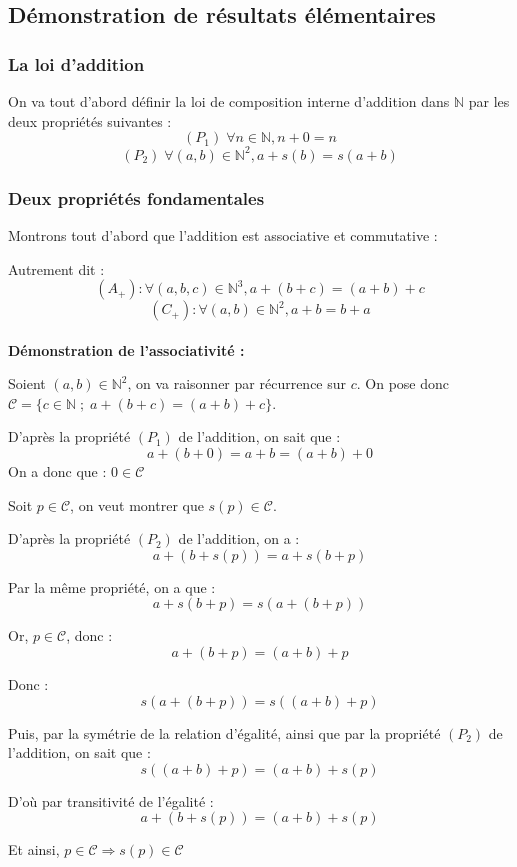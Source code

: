 \documentclass{article}
\begin{document}
\subsection{Démonstration de résultats élémentaires}

\subsubsection{La loi d'addition}
On va tout d'abord définir la loi de composition interne d'addition dans $\mathbb{N}$ par les deux propriétés suivantes :
$$(P_1) \; \forall n \in \mathbb{N}, n + 0 = n$$
$$(P_2) \; \forall (a,b) \in \mathbb{N}^2, a + s(b) = s(a+b)$$
\subsubsection{Deux propriétés fondamentales}


Montrons tout d'abord que l'addition est associative et commutative :

Autrement dit :
$$(A_+) : \forall (a,b,c) \in \mathbb{N}^3, a+(b+c) = (a+b)+c $$
$$(C_+) : \forall (a,b) \in \mathbb{N}^2, a+b=b+a$$
\\

\textbf{Démonstration de l'associativité :}

Soient $(a,b) \in \mathbb{N}^2$, on va raisonner par récurrence sur $c$. On pose donc $\mathcal{C} = \{ c \in \mathbb{N} \; ; \; a+(b+c) = (a+b)+c \}$.

D'après la propriété $(P_1)$ de l'addition, on sait que : 
$$ a + (b + 0) = a + b = (a + b) + 0$$
On a donc que : $0 \in \mathcal{C}$

Soit $p \in \mathcal{C}$, on veut montrer que $s(p) \in \mathcal{C}$.

D'après la propriété $(P_2)$ de l'addition, on a :
$$ a + (b+s(p)) = a + s(b+p)$$

Par la même propriété, on a que :
$$ a + s(b+p) = s(a + (b+p)) $$

Or, $p \in \mathcal{C}$, donc :
$$ a + (b+p) = (a + b) + p $$

Donc :
$$ s(a+(b+p)) = s((a+b)+p) $$

Puis, par la symétrie de la relation d'égalité, ainsi que par la propriété $(P_2)$ de l'addition, on sait que :
$$s((a+b)+p) = (a+b) + s(p)$$

D'où par transitivité de l'égalité :
$$ a + (b + s(p)) = (a+b) + s(p) $$

Et ainsi, $p \in \mathcal{C} \Rightarrow s(p) \in \mathcal{C}$
\end{document}
